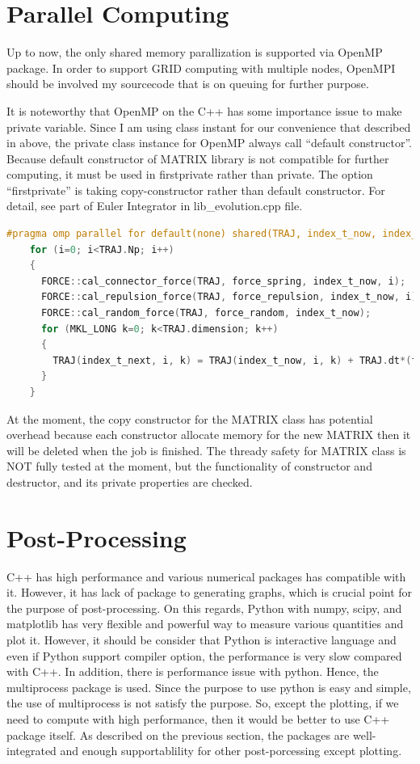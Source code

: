 \message{ !name(brief_Brownian_dynamics.tex)}\documentclass[10pt, a4paper]{report}
\begin{document}
\begin{appendices}
  \chapter{Parallel Computing}
  Up to now, the only shared memory parallization is supported via OpenMP package. In order to support GRID computing with multiple nodes, OpenMPI should be involved my sourcecode that is on queuing for further purpose. 

  It is noteworthy that OpenMP on the C++ has some importance issue to make private variable. Since I am using class instant for our convenience that described in above, the private class instance for OpenMP always call ``default constructor''. Because default constructor of MATRIX library is not compatible for further computing, it must be used in firstprivate rather than private. The option ``firstprivate'' is taking copy-constructor rather than default constructor.
  For detail, see part of Euler Integrator in lib{\_}evolution.cpp file.
  \begin{lstlisting}[language=C++,frame=single]
    #pragma omp parallel for default(none) shared(TRAJ, index_t_now, index_t_next) firstprivate(force_spring, force_repulsion, force_random)
    for (i=0; i<TRAJ.Np; i++)
    {
      FORCE::cal_connector_force(TRAJ, force_spring, index_t_now, i);
      FORCE::cal_repulsion_force(TRAJ, force_repulsion, index_t_now, i);
      FORCE::cal_random_force(TRAJ, force_random, index_t_now);
      for (MKL_LONG k=0; k<TRAJ.dimension; k++)
      {
        TRAJ(index_t_next, i, k) = TRAJ(index_t_now, i, k) + TRAJ.dt*(force_spring(k) + force_repulsion(k)) + sqrt(TRAJ.dt)*force_random(k);
      }
    }
  \end{lstlisting}

  At the moment, the copy constructor for the MATRIX class has potential overhead because each constructor allocate memory for the new MATRIX then it will be deleted when the job is finished. The thready safety for MATRIX class is NOT fully tested at the moment, but the functionality of constructor and destructor, and its private properties are checked.

  \chapter{Post-Processing}
  C++ has high performance and various numerical packages has compatible with it. However, it has lack of package to generating graphs, which is crucial point for the purpose of post-processing. On this regards, Python with numpy, scipy, and matplotlib has very flexible and powerful way to measure various quantities and plot it. However, it should be consider that Python is interactive language and even if Python support compiler option, the performance is very slow compared with C++. In addition, there is performance issue with python. Hence, the multiprocess package is used. Since the purpose to use python is easy and simple, the use of multiprocess is not satisfy the purpose. So, except the plotting, if we need to compute with high performance, then it would be better to use C++ package itself. As described on the previous section, the packages are well-integrated and enough supportablility for other post-porcessing except plotting. 


\end{appendices}
\end{document}
